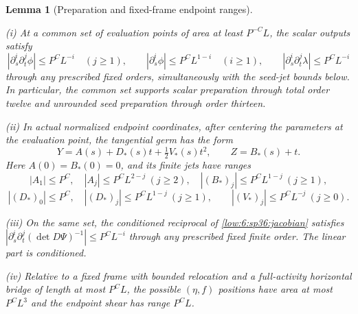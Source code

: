 \documentclass[11pt]{amsart}
\newtheorem{lemma}[theorem]{Lemma}
\theoremstyle{definition}
\theoremstyle{remark}
\numberwithin{equation}{section}
\begin{document}
\begin{lemma}[Preparation and fixed-frame endpoint ranges]\label{low:6:sp36:preparation}

\noindent\textup{(i)} At a common set of evaluation points of area at least $P^{-C}L$, the scalar outputs satisfy
\[
|\partial_s^i\partial_t^j\phi|\le P^CL^{-i}\quad(j\ge1),\qquad |\partial_s^i\phi|\le P^CL^{1-i}\quad(i\ge1),\qquad |\partial_s^i\partial_t^j\lambda|\le P^CL^{-i}
\]
through any prescribed fixed orders, simultaneously with the seed-jet bounds below. In particular, the common set supports scalar preparation through total order twelve and unrounded seed preparation through order thirteen.

\noindent\textup{(ii)} In actual normalized endpoint coordinates, after centering the parameters at the evaluation point, the tangential germ has the form
\[
Y=A(s)+D_*(s)t+\tfrac12V_*(s)t^2,\qquad Z=B_*(s)+t.
\]
Here $A(0)=B_*(0)=0$, and its finite jets have ranges
\[
|A_1|\le P^C,\quad |A_j|\le P^CL^{2-j}\ (j\ge2),\quad |(B_*)_j|\le P^CL^{1-j}\ (j\ge1),
\]
\[
|(D_*)_0|\le P^C,\quad |(D_*)_j|\le P^CL^{1-j}\ (j\ge1),\qquad |(V_*)_j|\le P^CL^{-j}\ (j\ge0).
\]

\noindent\textup{(iii)} On the same set, the conditioned reciprocal of \eqref{low:6:sp36:jacobian} satisfies $|\partial_s^i\partial_t^j(\det D\Psi)^{-1}|\le P^CL^{-i}$ through any prescribed fixed finite order. The linear part is conditioned.

\noindent\textup{(iv)} Relative to a fixed frame with bounded relocation and a full-activity horizontal bridge of length at most $P^CL$, the possible $(\eta,f)$ positions have area at most $P^CL^3$ and the endpoint shear has range $P^CL$.
\end{lemma}
\end{document}

